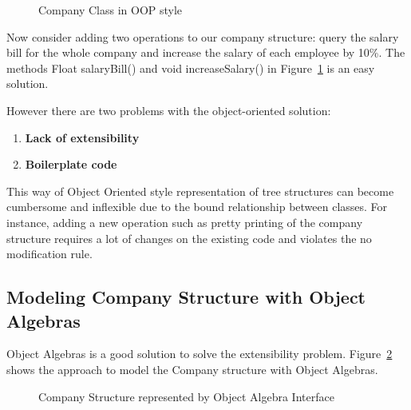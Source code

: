 \begin{figure}[tb]
\vspace{-.1in}
\caption{Company Class in OOP style}
\label{oop_company}
\end{figure}

Now consider adding two operations to our company structure: query the
salary bill for the whole company and increase the salary of each
employee by 10\%. The methods Float salaryBill() and void
increaseSalary() in Figure~\ref{oop_company} is an easy solution.

However there are two problems with the object-oriented solution:

\begin{enumerate}

\item {\bf Lack of extensibility} 

\item {\bf Boilerplate code} 

\end{enumerate}

This way of Object Oriented style representation of tree structures
can become cumbersome and inflexible due to the bound relationship
between classes. For instance, adding a new operation such as pretty
printing of the company structure requires a lot of changes on the
existing code and violates the no modification rule.



\subsection{Modeling Company Structure with Object Algebras}

Object Algebras is a good solution to solve the extensibility
problem.  
Figure~\ref{syb_tree} shows the approach to model the Company
structure with Object Algebras.

\begin{figure}[tb]
\vspace{-.1in}
\caption{Company Structure represented by Object Algebra Interface}
\label{syb_tree}
\end{figure}

